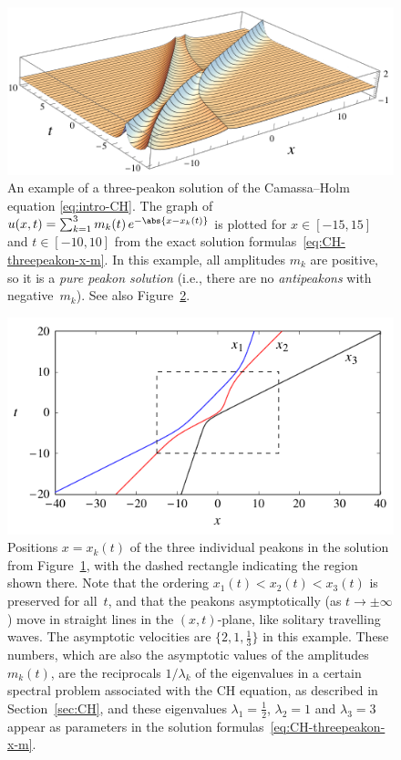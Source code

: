 \documentclass[10pt,a4paper]{article} \pdfoutput=1 
\begin{document}
\begin{figure}
  \centering
  \includegraphics[width=0.95\linewidth]{graphics/CH-pure3peakon-3d-labels.pdf}
  \caption{An example of a three-peakon solution of the Camassa--Holm equation
    \eqref{eq:intro-CH}.
    The graph of
    $u(x,t) = \sum_{k=1}^3 m_k(t) \, e^{-\abs{x - x_k(t)}}$
    is plotted for $x \in [-15,15]$ and $t \in [-10,10]$ from the exact solution
    formulas~\eqref{eq:CH-threepeakon-x-m}.
    In this example, all amplitudes $m_k$ are positive,
    so it is a \emph{pure peakon solution} (i.e., there are no \emph{antipeakons} with
    negative~$m_k$).
    See also Figure~\ref{fig:CH-3peakon-positions}.
  }
  \label{fig:CH-pure3peakon-3d}
\end{figure}

\begin{figure}
  \centering
  \includegraphics[width=1.0\linewidth]{graphics/CH-pure3peakon.pdf}
  \caption{Positions $x = x_k(t)$ of the three individual peakons in the solution
    from Figure~\ref{fig:CH-pure3peakon-3d}, with the dashed rectangle
    indicating the region shown there.
    Note that the ordering $x_1(t) < x_2(t) < x_3(t)$ is preserved for all~$t$,
    and that the peakons asymptotically (as $t \to \pm\infty$)
    move in straight lines in the $(x,t)$-plane,
    like solitary travelling waves.
    The asymptotic velocities are $\{ 2, 1, \tfrac13 \}$ in this example.
    These numbers, which are also the asymptotic values
    of the amplitudes $m_k(t)$,
    are the reciprocals $1/\lambda_k$ of the eigenvalues
    in a certain spectral problem associated with the CH equation,
    as described in Section~\ref{sec:CH},
    and these eigenvalues $\lambda_1 = \tfrac12$,
    $\lambda_2 = 1$ and $\lambda_3 = 3$ appear as parameters
    in the solution formulas~\eqref{eq:CH-threepeakon-x-m}.
  }
  \label{fig:CH-3peakon-positions}
\end{figure}
\end{document}
